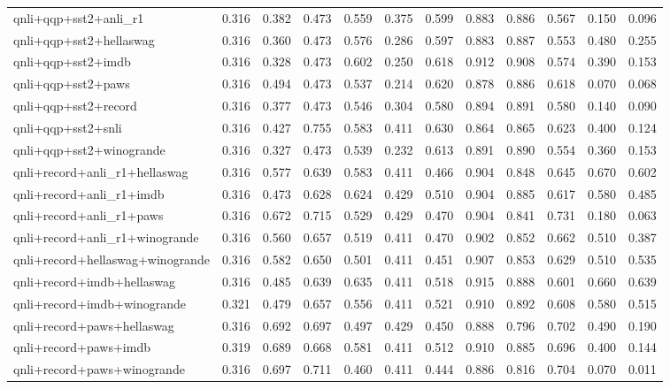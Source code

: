 \begin{table}[t]
\begin{tabular}{lrrrrrrrrrrr}
    qnli+qqp+sst2+anli\_r1 & 0.316 & 0.382 & 0.473 & 0.559 & 0.375 & 0.599 & 0.883 & 0.886 & 0.567 & 0.150 & 0.096 \\
    qnli+qqp+sst2+hellaswag & 0.316 & 0.360 & 0.473 & 0.576 & 0.286 & 0.597 & 0.883 & 0.887 & 0.553 & 0.480 & 0.255 \\
    qnli+qqp+sst2+imdb & 0.316 & 0.328 & 0.473 & 0.602 & 0.250 & 0.618 & 0.912 & 0.908 & 0.574 & 0.390 & 0.153 \\
    qnli+qqp+sst2+paws & 0.316 & 0.494 & 0.473 & 0.537 & 0.214 & 0.620 & 0.878 & 0.886 & 0.618 & 0.070 & 0.068 \\
    qnli+qqp+sst2+record & 0.316 & 0.377 & 0.473 & 0.546 & 0.304 & 0.580 & 0.894 & 0.891 & 0.580 & 0.140 & 0.090 \\
    qnli+qqp+sst2+snli & 0.316 & 0.427 & 0.755 & 0.583 & 0.411 & 0.630 & 0.864 & 0.865 & 0.623 & 0.400 & 0.124 \\
    qnli+qqp+sst2+winogrande & 0.316 & 0.327 & 0.473 & 0.539 & 0.232 & 0.613 & 0.891 & 0.890 & 0.554 & 0.360 & 0.153 \\
    qnli+record+anli\_r1+hellaswag & 0.316 & 0.577 & 0.639 & 0.583 & 0.411 & 0.466 & 0.904 & 0.848 & 0.645 & 0.670 & 0.602 \\
    qnli+record+anli\_r1+imdb & 0.316 & 0.473 & 0.628 & 0.624 & 0.429 & 0.510 & 0.904 & 0.885 & 0.617 & 0.580 & 0.485 \\
    qnli+record+anli\_r1+paws & 0.316 & 0.672 & 0.715 & 0.529 & 0.429 & 0.470 & 0.904 & 0.841 & 0.731 & 0.180 & 0.063 \\
    qnli+record+anli\_r1+winogrande & 0.316 & 0.560 & 0.657 & 0.519 & 0.411 & 0.470 & 0.902 & 0.852 & 0.662 & 0.510 & 0.387 \\
    qnli+record+hellaswag+winogrande & 0.316 & 0.582 & 0.650 & 0.501 & 0.411 & 0.451 & 0.907 & 0.853 & 0.629 & 0.510 & 0.535 \\
    qnli+record+imdb+hellaswag & 0.316 & 0.485 & 0.639 & 0.635 & 0.411 & 0.518 & 0.915 & 0.888 & 0.601 & 0.660 & 0.639 \\
    qnli+record+imdb+winogrande & 0.321 & 0.479 & 0.657 & 0.556 & 0.411 & 0.521 & 0.910 & 0.892 & 0.608 & 0.580 & 0.515 \\
    qnli+record+paws+hellaswag & 0.316 & 0.692 & 0.697 & 0.497 & 0.429 & 0.450 & 0.888 & 0.796 & 0.702 & 0.490 & 0.190 \\
    qnli+record+paws+imdb & 0.319 & 0.689 & 0.668 & 0.581 & 0.411 & 0.512 & 0.910 & 0.885 & 0.696 & 0.400 & 0.144 \\
    qnli+record+paws+winogrande & 0.316 & 0.697 & 0.711 & 0.460 & 0.411 & 0.444 & 0.886 & 0.816 & 0.704 & 0.070 & 0.011 \\

\end{tabular}
\end{table}
